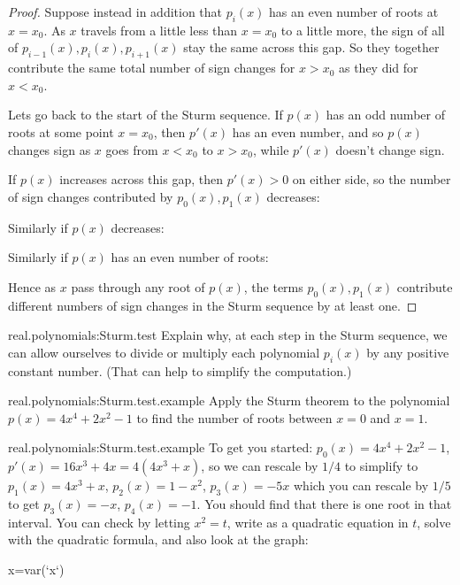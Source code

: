 \begin{proof}
Suppose instead in addition that \(p_i(x)\) has an even number of roots at \(x=x_0\).
As \(x\) travels from a little less than \(x=x_0\) to a little more, the sign of all of \(p_{i-1}(x), p_i(x), p_{i+1}(x)\) stay the same across this gap.
So they together contribute the same total number of sign changes for \(x>x_0\) as they did for \(x<x_0\).
\begin{center}
\qquad

\end{center}

Lets go back to the start of the Sturm sequence.
If \(p(x)\) has an odd number of roots at some point \(x=x_0\), then \(p'(x)\) has an even number, and so \(p(x)\) changes sign as \(x\) goes from \(x < x_0\) to \(x > x_0\), while \(p'(x)\) doesn't change sign.
\begin{center}
\qquad

\end{center}
If \(p(x)\) increases across this gap, then \(p'(x)>0\) on either side, so the number of sign changes contributed by \(p_0(x), p_1(x)\) decreases:
\begin{center}

\end{center}
Similarly if \(p(x)\) decreases:
\begin{center}

\end{center}
Similarly if \(p(x)\) has an even number of roots:
\begin{center}
\qquad

\end{center}
Hence as \(x\) pass through any root of \(p(x)\), the terms \(p_0(x), p_1(x)\) contribute different numbers of sign changes in the Sturm sequence by at least one.
\end{proof}
\begin{problem}{real.polynomials:Sturm.test}
Explain why, at each step in the Sturm sequence, we can allow ourselves to divide or multiply each polynomial \(p_i(x)\) by any positive constant number. (That can help to simplify the computation.)
\end{problem}
\begin{problem}{real.polynomials:Sturm.test.example}
Apply the Sturm theorem to the polynomial \(p(x)=4x^4+2x^2-1\) to find the number of roots between \(x=0\) and \(x=1\).
\end{problem}
\begin{answer}{real.polynomials:Sturm.test.example}
To get you started: \(p_0(x)=4x^4+2x^2-1\), \(p'(x)=16x^3+4x=4(4x^3+x)\), so we can rescale by \(1/4\) to simplify to \(p_1(x)=4x^3+x\), \(p_2(x)=1-x^2\), \(p_3(x)=-5x\) which you can rescale by \(1/5\) to get \(p_3(x)=-x\), \(p_4(x)=-1\).
You should find that there is one root in that interval. You can check by letting \(x^2=t\), write as a quadratic equation in \(t\), solve with the quadratic formula, and also look at the graph:
\begin{center}
\begin{sagesilent}
x=var(`x`)
\end{sagesilent}
\end{center}
\end{answer}

